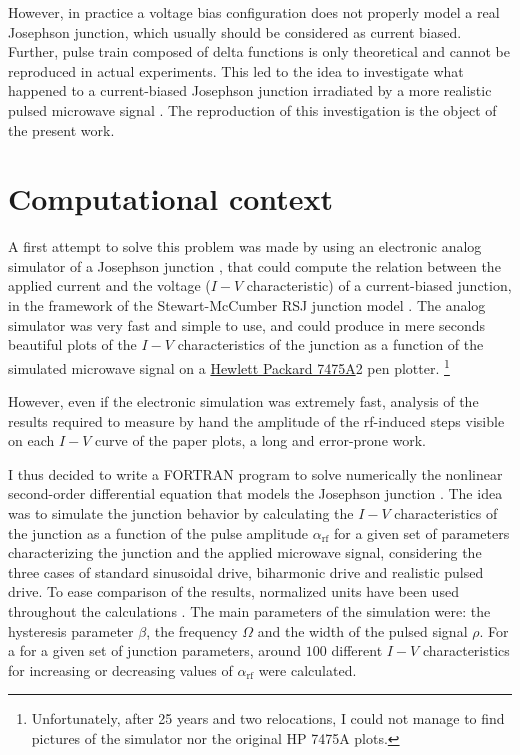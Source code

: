 However, in practice a voltage bias configuration does not properly model a real Josephson junction, which usually should be considered as current biased.
Further, pulse train composed of delta functions is only theoretical and cannot be reproduced in actual experiments. 
This led to the idea to investigate what happened to a current-biased Josephson junction irradiated by a more realistic pulsed microwave signal \cite{Maggi:1996, Maggi:1997}. 
The reproduction of this investigation is the object of the present work.


\section{Computational context}
\label{computational-context}

A first attempt to solve this problem was made by using an electronic analog simulator of a Josephson junction \cite {Henry:1981}, that could compute the relation between the applied current and the voltage ($I-V$ characteristic) of a current-biased junction, in the framework of the Stewart-McCumber RSJ junction model \cite{McCumber:1968, Stewart:1974}.
The analog simulator was very fast and simple to use, and could produce in mere seconds beautiful plots of the $I-V$ characteristics of the junction as a function of the simulated microwave signal on a \href{http://www.hpmuseum.net/display_item.php?hw=74}{Hewlett Packard 7475A}2 pen plotter.
\footnote{Unfortunately, after 25 years and two relocations, I could not manage to find pictures of the simulator nor the original HP 7475A plots.} 

However, even if the electronic simulation was extremely fast, analysis of the results required to measure by hand the amplitude of the rf-induced steps visible on each $I-V$ curve of the paper plots, a long and error-prone work.

I thus decided to write a FORTRAN program to solve numerically the nonlinear second-order differential equation that models the Josephson junction \cite{McCumber:1968, Stewart:1974}. 
The idea was to simulate the junction behavior by calculating the $I-V$ characteristics of the junction as a function of the pulse amplitude $\alpha_\mathrm{rf}$ for a given set of parameters characterizing the junction and the applied microwave signal, considering the three cases of standard sinusoidal drive, biharmonic drive and realistic pulsed drive. 
To ease comparison of the results, normalized units have been used throughout the calculations \cite{McCumber:1968, Stewart:1974}.
The main parameters of the simulation were: the hysteresis parameter $\beta$, the frequency $\Omega$ and the width of the pulsed signal $\rho$. 
For a for a given set of junction parameters, around $100$ different $I-V$ characteristics for increasing or decreasing values of $\alpha_\mathrm{rf}$ were calculated.


